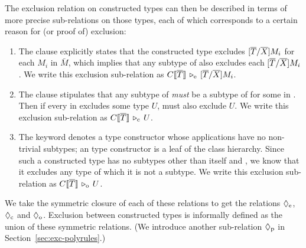 %
The exclusion relation on constructed types can then be described in terms of
more precise sub-relations on those types, each of which corresponds to a certain
reason for (or proof of) exclusion:
\begin{enumerate}
  \item The  clause explicitly states that
the constructed type 
excludes $[\overline{T}/\overline{X}]M_i$ for each $M_i$ in $\bar{M}$, which
implies that any subtype of  also excludes
each $[\overline{T}/\overline{X}]M_i$. We write this exclusion sub-relation as
$C\llbracket \overline{T} \rrbracket \,\triangleright_\textrm{e}\, [\overline{T}/\overline{X}]M_i$.

  \item The  clause stipulates that any subtype of  \emph{must} be a subtype of  for some  in . Then if every  in  excludes some type $U$,  must also exclude $U$. We write this exclusion sub-relation as $C\llbracket \overline{T} \rrbracket \,\triangleright_\textrm{c}\, U$.
  
  \item The  keyword denotes a type constructor whose applications have no non-trivial subtypes; an  type constructor is a leaf of the class hierarchy. Since such a constructed type  has no subtypes other than itself and \BottomType, we know that it excludes any type  of which it is not a subtype. We write this exclusion sub-relation as $C\llbracket \overline{T} \rrbracket \,\triangleright_\textrm{o}\, U$.
\end{enumerate}
We take the symmetric closure of each of these relations 
to get the relations $\mathrel{\lozenge}_\textrm{e}$, $\mathrel{\lozenge}_\textrm{c}$ and $\mathrel{\lozenge}_\textrm{o}$.
Exclusion between constructed types is informally defined as the union
of these symmetric relations.
(We introduce another sub-relation $\mathrel{\lozenge}_\textrm{p}$ in Section~\ref{sec:exc-polyrules}.)

